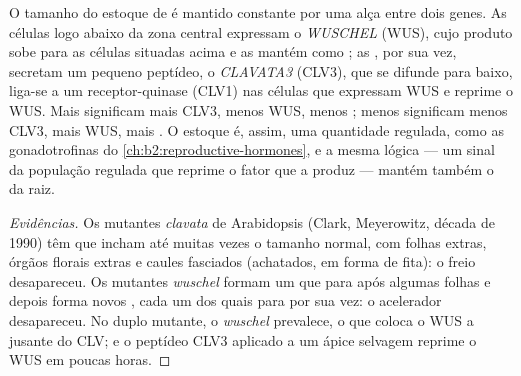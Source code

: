 \begin{proposition}\label{prop:b2:plant-meristems:wus}
O tamanho do estoque de  é mantido constante por uma alça
entre dois genes. As células logo abaixo da zona central expressam o
 \emph{WUSCHEL} (WUS), cujo produto sobe para as
células situadas acima e as mantém como ; as
, por sua vez, secretam um pequeno peptídeo, o
\emph{CLAVATA3} (CLV3), que se difunde para baixo, liga-se a um
receptor-quinase (CLV1) nas células que expressam WUS e reprime o WUS.
Mais  significam mais CLV3, menos WUS, menos
; menos  significam menos CLV3, mais WUS,
mais . O estoque é, assim, uma quantidade regulada, como
as gonadotrofinas do \cref{ch:b2:reproductive-hormones}, e a mesma lógica --- um sinal da
população regulada que reprime o fator que a produz --- mantém também o
 da raiz.
\end{proposition}
\begin{proof}[Evidências]
Os mutantes \emph{clavata} de Arabidopsis (Clark, Meyerowitz, década de
1990) têm  que incham até muitas vezes o tamanho normal, com
folhas extras, órgãos florais extras e caules fasciados (achatados, em
forma de fita): o freio desapareceu. Os mutantes \emph{wuschel} formam
um  que para após algumas folhas e depois forma novos
, cada um dos quais para por sua vez: o acelerador
desapareceu. No duplo mutante, o  \emph{wuschel} prevalece, o
que coloca o WUS a jusante do CLV; e o peptídeo CLV3 aplicado a um
ápice selvagem reprime o WUS em poucas horas.
\end{proof}

